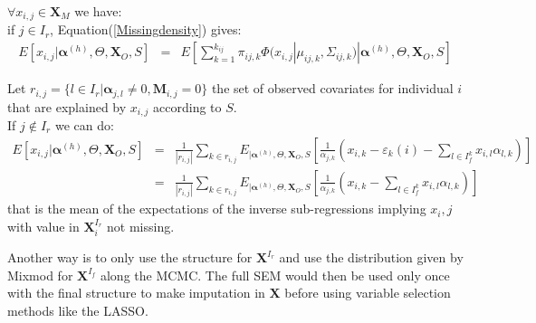\documentclass[12pt,a4paper]{report}
\begin{document}
	$\forall x_{i,j} \in \boldsymbol{X}_M $ we have:
	\\
if $j\in I_r$, Equation(\ref{Missingdensity}) gives: 
	\begin{eqnarray}
	E[x_{i,j}|\boldsymbol{\alpha}^{(h)},\Theta,\boldsymbol{X}_O,S]&=&E[\sum_{k=1}^{k_{ij}}\pi_{ij,k}\Phi(x_{i,j}|\mu_{ij,k},\Sigma_{ij,k})|\boldsymbol{\alpha}^{(h)},\Theta,\boldsymbol{X}_O,S] 
	\end{eqnarray}
	  
	Let $r_{i,j}=\{l \in I_r| \boldsymbol{\alpha}_{j,l}\neq 0, \boldsymbol{M}_{i,j}=0 \}$ the set of observed covariates for individual $i$ that are explained by $x_{i,j}$ according to $S$.
	\\
	If $j\notin I_r$ we can do:
	\begin{eqnarray}
	E[x_{i,j}|\boldsymbol{\alpha}^{(h)},\Theta,\boldsymbol{X}_O,S]&=&\frac{1}{|r_{i,j}|}\sum_{k \in r_{i,j}}E_{|\boldsymbol{\alpha}^{(h)},\Theta,\boldsymbol{X}_O,S}\left[\frac{1}{\alpha_{j,k}}\left(x_{i,k}-\varepsilon_{k}(i)-\sum_{l \in I_f^k} x_{i,l}\alpha_{l,k}\right)\right] \\
	&=& \frac{1}{|r_{i,j}|}\sum_{k \in r_{i,j}}E_{|\boldsymbol{\alpha}^{(h)},\Theta,\boldsymbol{X}_O,S}\left[\frac{1}{\alpha_{j,k}}\left(x_{i,k}- \sum_{l \in I_f^k} x_{i,l}\alpha_{l,k}\right)\right]
	\end{eqnarray}
	that is the mean of the expectations of the inverse sub-regressions implying $x_i,j$ with value in $\boldsymbol{X}^{I_r}_i$ not missing.



Another way is to only use the structure for $\boldsymbol{X}^{I_r}$ and use the distribution given by Mixmod for $\boldsymbol{X}^{I_f}$ along the MCMC. The full SEM would then be used only once with the final structure to make imputation in $\boldsymbol{X}$ before using variable selection methods like the LASSO.
\end{document}
